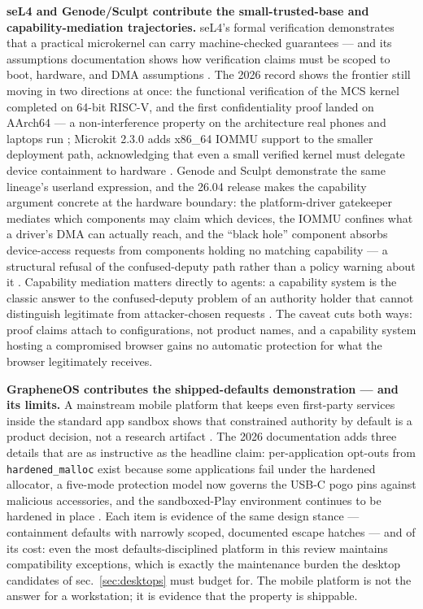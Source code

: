 \documentclass[
  english,
  9pt,
]{extarticle}
\begin{document}
\textbf{seL4 and Genode/Sculpt contribute the small-trusted-base and
capability-mediation trajectories.} seL4's formal verification
demonstrates that a practical microkernel can carry machine-checked
guarantees --- and its assumptions documentation shows how verification
claims must be scoped to boot, hardware, and DMA assumptions
\citep{sel4_verification_assumptions, klein2009}. The 2026 record shows
the frontier still moving in two directions at once: the functional
verification of the MCS kernel completed on 64-bit RISC-V, and the first
confidentiality proof landed on AArch64 --- a non-interference property
on the architecture real phones and laptops run \citep{sel4_2026_news};
Microkit 2.3.0 adds x86\_64 IOMMU support to the smaller deployment
path, acknowledging that even a small verified kernel must delegate
device containment to hardware \citep{microkit_2_3}. Genode and Sculpt
demonstrate the same lineage's userland expression, and the 26.04
release makes the capability argument concrete at the hardware boundary:
the platform-driver gatekeeper mediates which components may claim which
devices, the IOMMU confines what a driver's DMA can actually reach, and
the ``black hole'' component absorbs device-access requests from
components holding no matching capability --- a structural refusal of
the confused-deputy path rather than a policy warning about it
\citep{sculpt_26_04, levy1984}. Capability mediation matters directly to
agents: a capability system is the classic answer to the confused-deputy
problem of an authority holder that cannot distinguish legitimate from
attacker-chosen requests \citep{hardy1988}. The caveat cuts both ways:
proof claims attach to configurations, not product names, and a
capability system hosting a compromised browser gains no automatic
protection for what the browser legitimately receives.

\textbf{GrapheneOS contributes the shipped-defaults demonstration ---
and its limits.} A mainstream mobile platform that keeps even
first-party services inside the standard app sandbox shows that
constrained authority by default is a product decision, not a research
artifact \citep{grapheneos_features}. The 2026 documentation adds three
details that are as instructive as the headline claim: per-application
opt-outs from \texttt{hardened\_malloc} exist because some applications
fail under the hardened allocator, a five-mode protection model now
governs the USB-C pogo pins against malicious accessories, and the
sandboxed-Play environment continues to be hardened in place
\citep{grapheneos_releases}. Each item is evidence of the same design
stance --- containment defaults with narrowly scoped, documented escape
hatches --- and of its cost: even the most defaults-disciplined platform
in this review maintains compatibility exceptions, which is exactly the
maintenance burden the desktop candidates of sec.~\ref{sec:desktops}
must budget for. The mobile platform is not the answer for a
workstation; it is evidence that the property is shippable.
\end{document}
